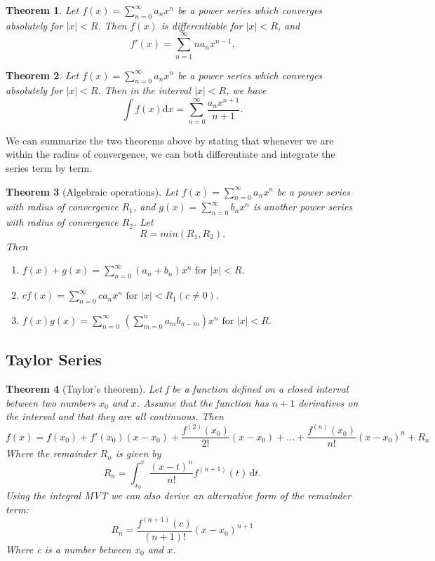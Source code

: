 \documentclass[11pt,a4paper]{article}
\newcommand\dee{\text{d}}
\newcommand\sumOfSeries{\sum_{n = 0}^{\infty}}
\newtheorem{theorem}{Theorem}
\theoremstyle{definition}
\begin{document}
\begin{theorem}
    Let $ f(x) = \sumOfSeries a_n x^n $ be a power series which converges absolutely for $ |x| < R $. Then $ f(x) $ is differentiable for $ |x| < R $, and
    \[ f'(x) = \sum_{n = 1}^\infty na_nx^{n - 1}.\]
\end{theorem}

\begin{theorem}
    Let $ f(x) = \sumOfSeries a_n x^n $ be a power series which converges absolutely for $ |x| < R $. Then in the interval $ |x| < R $, we have 
    \[ \int f(x) \dee x = \sumOfSeries \frac{a_n x^{n + 1}}{n + 1}.\]
\end{theorem}

We can summarize the two theorems above by stating that whenever we are within the radius of convergence, we can both differentiate and integrate the series term by term.

\begin{theorem}[Algebraic operations]
    Let $ f(x) = \sumOfSeries a_n x^n $ be a power series with radius of convergence $R_1$, and $ g(x) = \sumOfSeries b_n x^n $ is another power series with 
    radius of convergence $R_2$. Let
    \[ R = min(R_1, R_2).\]
    Then
    \begin{enumerate}
        \item $ f(x) + g(x) = \sumOfSeries (a_n + b_n) x^n \text{ for } |x| < R. $ 
        \item $ cf(x) = \sumOfSeries c a_n x^n \text{ for } |x| < R_1 (c \neq 0).$ 
        \item $ f(x)g(x) = \sumOfSeries \, (\sum_{m = 0}^n a_m b_{n - m}) x^n \text{ for } |x| < R.$
    \end{enumerate}
\end{theorem}

\subsection{Taylor Series}

\begin{theorem}[Taylor's theorem]
    Let f be a function defined on a closed interval between two numbers $ x_0 $ and $ x $. Assume that the function has $ n + 1 $ derivatives on the interval and that they are all continuous.
    Then 
    \[ f(x) = f(x_0) + f'(x_0)(x - x_0) + \frac{f^{(2)}(x_0)}{2!}(x - x_0) + ... + \frac{f^{(n)}(x_0)}{n!}(x - x_0)^n + R_n\]
    Where the remainder $ R_n $ is given by 
    \[ R_n = \int_{x_0}^x \frac{(x - t)^n}{n!} f^{(n+1)}(t) \, \dee t.\]
    Using the integral MVT we can also derive an alternative form of the remainder term:
    \[ R_n = \frac{f^{(n+1)} (c)}{(n + 1)!}(x - x_0)^{n + 1}\]
    Where c is a number between $ x_0 $ and $ x $.
\end{theorem}
\end{document}

